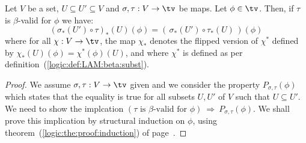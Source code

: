 \begin{prop}\label{logic:prop:LAM:beta:valid:composition:gen}
    Let $V$ be a set, $U\subseteq U' \subseteq V$ and $\sigma,\tau:V\to\tv$ 
    be maps. Let $\phi\in\tv$. Then, if $\tau$ is $\beta$-valid for $\phi$ 
    we have:
        \[
            (\sigma_{*}(U')\circ\tau)_{*}(U)(\phi)
            =(\,\sigma_{*}(U')\circ\tau_{*}(U)\,)(\phi)
        \]
    where for all $\chi:V\to\tv$, the map $\chi_{*}$ denotes the flipped version 
    of $\chi^{*}$ defined by $\chi_{*}(U)(\phi)=\chi^{*}(\phi)(U)$, and where 
    $\chi^{*}$ is defined as per definition~(\ref{logic:def:LAM:beta:subst}).
\end{prop}
\begin{proof}
    We assume $\sigma,\tau:V\to\tv$ given and we consider the property
    $P_{\sigma,\tau}(\phi)$ which states that the equality is true for
    all subsets $U,U'$ of $V$ such that $U\subseteq U'$. We need to show
    the implcation $(\tau\mbox{\ is $\beta$-valid for\ }\phi)\ \Rightarrow\
    P_{\sigma,\tau}(\phi)$. We shall prove this implication by structural
    induction on $\phi$, using theorem~(\ref{logic:the:proof:induction})
    of page~\pageref{logic:the:proof:induction}.


\end{proof}
